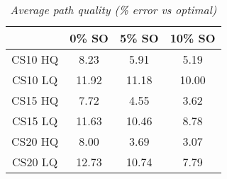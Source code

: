 \begin{table}[ht]
\begin{center}
\caption{\emph{Average path quality (\% error vs optimal)}}
\label{aha-table:pathquality}
\begin{tabular*}{0.4\textwidth}{@{\extracolsep{\fill}}cccc}%
  \hline
 & 0\% SO & 5\% SO & 10\% SO \\
  \hline
 \small{CS10 HQ} & \small{8.23} & \small{5.91} & \small{5.19} \\
 \small{CS10 LQ} & \small{11.92} & \small{11.18} & \small{10.00} \\
 \small{CS15 HQ} & \small{7.72} & \small{4.55} & \small{3.62} \\
 \small{CS15 LQ} & \small{11.63} & \small{10.46} & \small{8.78} \\
 \small{CS20 HQ} & \small{8.00} & \small{3.69} & \small{3.07} \\
 \small{CS20 LQ} & \small{12.73} & \small{10.74} & \small{7.79} \\
   \hline
\end{tabular*}
\end{center}
\end{table}
